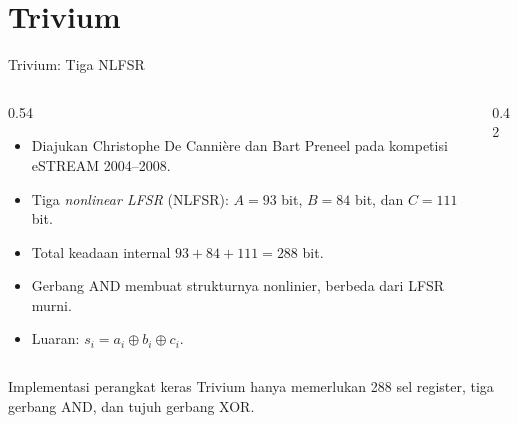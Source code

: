 \documentclass[aspectratio=169,11pt]{beamer}
\begin{document}
\section{Trivium}

\begin{frame}{Trivium: Tiga NLFSR}
    \footnotesize
    \begin{columns}[T,onlytextwidth]
        \begin{column}{0.54\textwidth}
            \begin{itemize}
                \item Diajukan Christophe De Cannière dan Bart Preneel pada
                      kompetisi eSTREAM 2004--2008.
                \item Tiga \textit{nonlinear LFSR} (NLFSR): $A=93$ bit,
                      $B=84$ bit, dan $C=111$ bit.
                \item Total keadaan internal $93+84+111=288$ bit.
                \item Gerbang AND membuat strukturnya nonlinier, berbeda
                      dari LFSR murni.
                \item Luaran:
                      $s_i=a_i\oplus b_i\oplus c_i$.
            \end{itemize}
        \end{column}
        \begin{column}{0.42\textwidth}
            \centering
        \end{column}
    \end{columns}
    \vspace{0.1cm}
    \begin{block}{Implementasi perangkat keras}
        Trivium hanya memerlukan 288 sel register, tiga gerbang AND, dan
        tujuh gerbang XOR.
    \end{block}
\end{frame}
\end{document}
